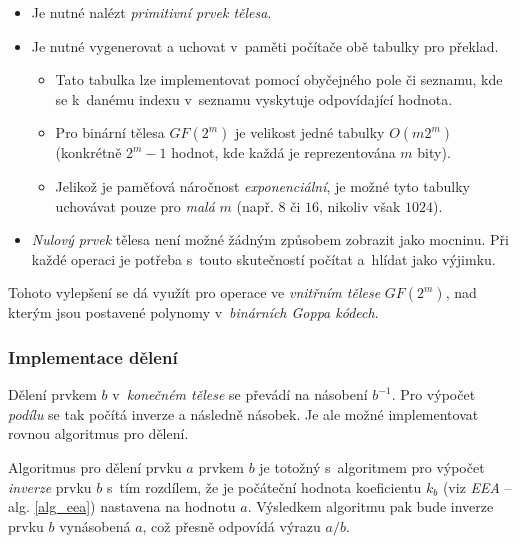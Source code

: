 \documentclass[thesis=M,czech,hidelinks]{FITthesis}[2012/06/26]
\newcommand{\0}{{\textcolor[gray]{0.80}{0}}}
\begin{document}
\begin{itemize}
    \item Je nutné nalézt \emph{primitivní prvek tělesa}.

    \item Je nutné vygenerovat a uchovat v~paměti počítače obě tabulky pro
        překlad.
        \begin{itemize}
            \item Tato tabulka lze implementovat pomocí obyčejného pole či
                sezna\-mu, kde se k~danému indexu v~seznamu vyskytuje
                odpovídající hodnota.
            \item Pro binární  tělesa $GF(2^m)$ je velikost jedné tabulky
                $O(m 2^m)$ (konkrétně $2^m - 1$ hodnot, kde každá je
                reprezentována $m$ bity).
            \item Jelikož je paměťová náročnost \emph{exponenciální}, je možné
                tyto tabulky uchovávat pouze pro \emph{malá} $m$ (např.  $8$ či
                $16$, nikoliv však $1024$).
        \end{itemize}

    \item \emph{Nulový prvek} tělesa není možné žádným způsobem zobrazit jako
        mocninu. Při každé operaci je potřeba s~touto skutečností počítat
        a~hlídat jako výjimku.

\end{itemize}


Tohoto vylepšení se dá využít pro operace ve \emph{vnitřním tělese} $GF(2^m)$,
nad kterým jsou postavené polynomy v~\emph{binárních Goppa kódech}.


\subsubsection{Implementace dělení}

Dělení prvkem $b$ v~\emph{konečném tělese} se převádí na násobení $b^{-1}$. Pro
výpočet \emph{podílu} se tak počítá inverze a následně násobek. Je ale možné
implementovat rovnou algoritmus pro dělení.

Algoritmus pro dělení prvku $a$ prvkem $b$ je totožný s~algoritmem pro výpočet
\emph{inverze} prvku $b$ s~tím rozdílem, že je počáteční hodnota koeficientu
$k_b$ (viz \emph{EEA} -- alg. \ref{alg_eea}) nastavena na hodnotu $a$.
%
Výsledkem algoritmu pak bude inverze prvku $b$ vynásobená $a$, což přesně
odpovídá výrazu $a/b$.
\end{document}
